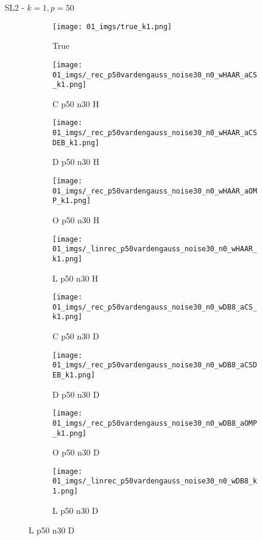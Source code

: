 \begin{frame}{SL2 - $k=1,p=50$}{}
\begin{figure}
\begin{subfigure}{0.1\textwidth}
\texttt{[image: 01\_imgs/true\_k1.png]}
\caption*{\Tiny True}
\end{subfigure}
\begin{subfigure}{0.1\textwidth}
\texttt{[image: 01\_imgs/\_rec\_p50vardengauss\_noise30\_n0\_wHAAR\_aCS\_k1.png]}
\caption*{\Tiny C p50 n30 H}
\end{subfigure}
\begin{subfigure}{0.1\textwidth}
\texttt{[image: 01\_imgs/\_rec\_p50vardengauss\_noise30\_n0\_wHAAR\_aCSDEB\_k1.png]}
\caption*{\Tiny D p50 n30 H}
\end{subfigure}
\begin{subfigure}{0.1\textwidth}
\texttt{[image: 01\_imgs/\_rec\_p50vardengauss\_noise30\_n0\_wHAAR\_aOMP\_k1.png]}
\caption*{\Tiny O p50 n30 H}
\end{subfigure}
\begin{subfigure}{0.1\textwidth}
\texttt{[image: 01\_imgs/\_linrec\_p50vardengauss\_noise30\_n0\_wHAAR\_k1.png]}
\caption*{\Tiny L p50 n30 H}
\end{subfigure}
\begin{subfigure}{0.1\textwidth}
\texttt{[image: 01\_imgs/\_rec\_p50vardengauss\_noise30\_n0\_wDB8\_aCS\_k1.png]}
\caption*{\Tiny C p50 n30 D}
\end{subfigure}
\begin{subfigure}{0.1\textwidth}
\texttt{[image: 01\_imgs/\_rec\_p50vardengauss\_noise30\_n0\_wDB8\_aCSDEB\_k1.png]}
\caption*{\Tiny D p50 n30 D}
\end{subfigure}
\begin{subfigure}{0.1\textwidth}
\texttt{[image: 01\_imgs/\_rec\_p50vardengauss\_noise30\_n0\_wDB8\_aOMP\_k1.png]}
\caption*{\Tiny O p50 n30 D}
\end{subfigure}
\begin{subfigure}{0.1\textwidth}
\texttt{[image: 01\_imgs/\_linrec\_p50vardengauss\_noise30\_n0\_wDB8\_k1.png]}
\caption*{\Tiny L p50 n30 D}
\end{subfigure}
\end{figure}
\end{frame}


